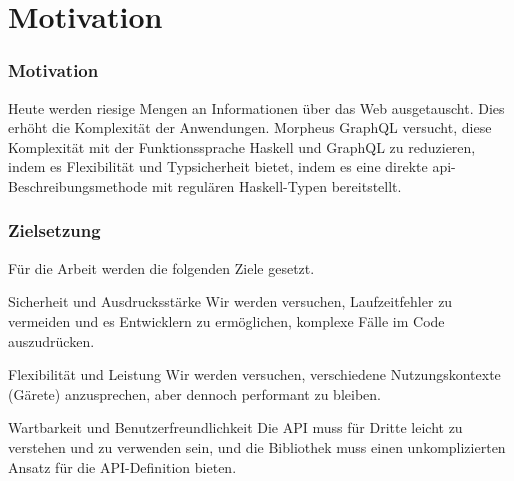 
\section{Motivation}

\begin{frame}{}
    \frametitle{Motivation}

    Heute werden riesige Mengen an Informationen über das Web ausgetauscht. Dies erhöht die Komplexität der Anwendungen. Morpheus GraphQL versucht, diese Komplexität mit der Funktionssprache Haskell und GraphQL zu reduzieren, indem es Flexibilität und Typsicherheit bietet, indem es eine direkte api-Beschreibungsmethode mit regulären Haskell-Typen bereitstellt. 

\end{frame}

\begin{frame}
    \frametitle{Zielsetzung}

    Für die Arbeit werden die folgenden Ziele gesetzt.    



        \footnotesize

        \begin{alertblock}{Sicherheit und Ausdrucksstärke}
            Wir werden versuchen, Laufzeitfehler zu vermeiden und es Entwicklern zu ermöglichen, komplexe Fälle im Code auszudrücken.
        \end{alertblock}

        \begin{alertblock}{Flexibilität und Leistung} 
            Wir werden  versuchen, verschiedene Nutzungskontexte (Gärete) anzusprechen, aber dennoch performant zu bleiben. 
        \end{alertblock}

        \begin{alertblock}{Wartbarkeit und Benutzerfreundlichkeit} 
            Die API muss für Dritte leicht zu verstehen und zu verwenden sein, und die Bibliothek muss einen unkomplizierten Ansatz für die API-Definition bieten. 
        \end{alertblock}
\end{frame}

